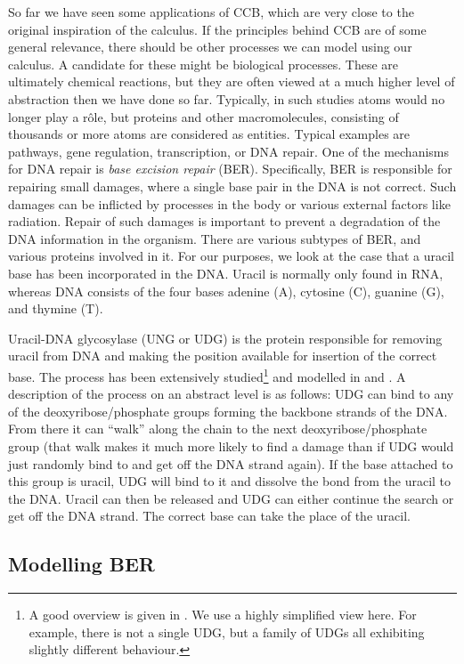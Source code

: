 \documentclass[review]{elsarticle}
\begin{document}
So far we have seen some applications of CCB, which are very close to the original inspiration of the calculus. If the principles behind CCB are of some general relevance, there should be other processes we can model using our calculus. A candidate for these might be biological processes. These are ultimately chemical reactions, but they are often viewed at a much higher level of abstraction then we have done so far. Typically, in such studies atoms would no longer play a r\^{o}le, but proteins and other macromolecules, consisting of thousands or more atoms are considered as entities. Typical examples are pathways, gene regulation, transcription, or DNA repair. One of the mechanisms for DNA repair is \emph{base excision repair} (BER). Specifically, BER is responsible for repairing small damages, where a single base pair in the DNA is not correct. Such damages can be inflicted by processes in the body or various external factors like radiation. Repair of such damages is important to prevent a degradation of the DNA information in the organism. There are various subtypes of BER, and various proteins involved in it. For our purposes, we look at the case that a uracil base has been incorporated in the DNA. Uracil is normally only found in RNA, whereas DNA consists of the four bases adenine (A), cytosine (C), guanine (G), and thymine (T).

Uracil-DNA glycosylase (UNG or UDG) is the protein responsible for removing uracil from DNA and making the position available for insertion of the correct base. The process has been extensively studied\footnote{A good overview is given in \cite{pmid25252105}. We use a highly simplified view here. For example, there is not a single UDG, but a family of UDGs all exhibiting slightly different behaviour.} and modelled in \cite{Koehler2014} and \cite{kappadna}. A description of the process on an abstract level is as follows: UDG can bind to any of the deoxyribose/phosphate groups forming the backbone strands of the DNA. From there it can ``walk'' along the chain to the next deoxyribose/phosphate group (that walk makes it much more likely to find a damage than if UDG would just randomly bind to and get off the DNA strand again). If the base attached to this group is uracil, UDG will bind to it and dissolve the bond from the uracil to the DNA. Uracil can then be released and UDG can either continue the search or get off the DNA strand. The correct base can take the place of the uracil.

\subsection{Modelling BER}
\end{document}
